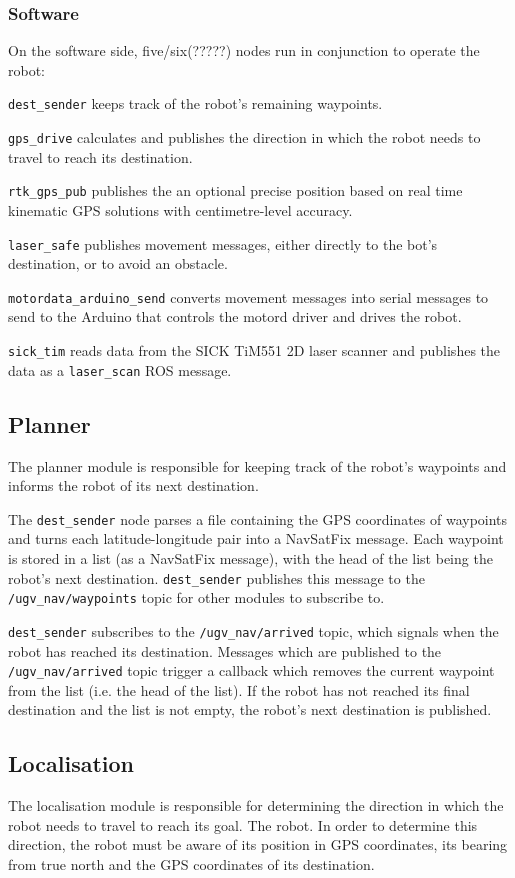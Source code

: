 \documentclass[titlepage,12pt,a4paper]{article}
\begin{document}
\subsubsection{Software}

On the software side, five/six(?????) nodes run in conjunction to operate the robot:

\verb|dest_sender| keeps track of the robot's remaining waypoints.

\verb|gps_drive| calculates and publishes the direction in which the robot needs to travel to reach its destination.

\verb|rtk_gps_pub| publishes the an optional precise position based on real time kinematic GPS solutions with centimetre-level accuracy.

\verb|laser_safe| publishes movement messages, either directly to the bot's destination, or to avoid an obstacle.

\verb|motordata_arduino_send| converts movement messages into serial messages to send to the Arduino that controls the motord driver and drives the robot.

\verb|sick_tim| reads data from the SICK TiM551 2D laser scanner and publishes the data as a \verb|laser_scan| ROS message.

\pagebreak

\subsection{Planner}
The planner module is responsible for keeping track of the robot's waypoints and informs the robot of its next destination. 

The \verb|dest_sender| node parses a file containing the GPS coordinates of waypoints and turns each latitude-longitude pair into a NavSatFix message. Each waypoint is stored in a list (as a NavSatFix message), with the head of the list being the robot's next destination. \verb|dest_sender| publishes this message to the \verb|/ugv_nav/waypoints| topic for other modules to subscribe to.

\verb|dest_sender| subscribes to the \verb|/ugv_nav/arrived| topic, which signals when the robot has reached its destination. Messages which are published to the \verb|/ugv_nav/arrived| topic trigger a callback which removes the current waypoint from the list (i.e. the head of the list). If the robot has not reached its final destination and the list is not empty, the robot's next destination is published.

\subsection{Localisation}
The localisation module is responsible for determining the direction in which the robot needs to travel to reach its goal. The robot. In order to determine this direction, the robot must be aware of its position in GPS coordinates, its bearing from true north and the GPS coordinates of its destination.
\end{document}
